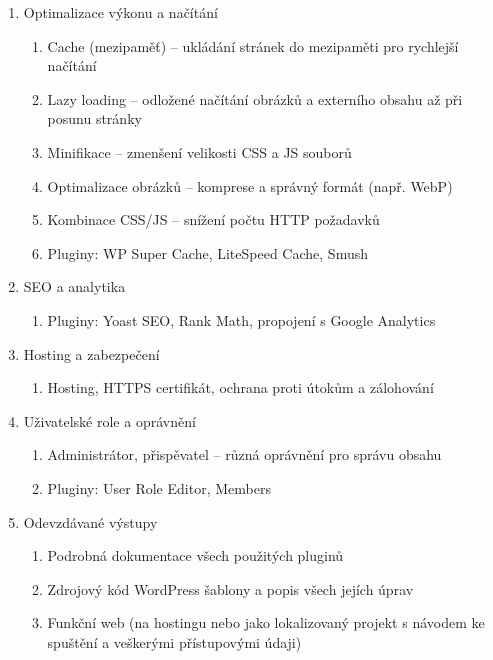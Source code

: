 \begin{enumerate}
  \begin{enumerate}
  \def\labelenumii{\alph{enumii}.}
  \tightlist
  \item
    Vytvoření galerie s možností seskupení podle názvu nebo roku
  \item
    Pluginy: Modula, Envira Gallery, NextGEN Gallery
  \end{enumerate}
\item
  Optimalizace výkonu a načítání

  \begin{enumerate}
  \def\labelenumii{\alph{enumii}.}
  \tightlist
  \item
    Cache (mezipaměť) -- ukládání stránek do mezipaměti pro rychlejší
    načítání
  \item
    Lazy loading -- odložené načítání obrázků a externího obsahu až při
    posunu stránky
  \item
    Minifikace -- zmenšení velikosti CSS a JS souborů
  \item
    Optimalizace obrázků -- komprese a správný formát (např. WebP)
  \item
    Kombinace CSS/JS -- snížení počtu HTTP požadavků
  \item
    Pluginy: WP Super Cache, LiteSpeed Cache, Smush
  \end{enumerate}
\item
  SEO a analytika

  \begin{enumerate}
  \def\labelenumii{\alph{enumii}.}
  \tightlist
  \item
    Pluginy: Yoast SEO, Rank Math, propojení s Google Analytics
  \end{enumerate}
\item
  Hosting a zabezpečení

  \begin{enumerate}
  \def\labelenumii{\alph{enumii}.}
  \tightlist
  \item
    Hosting, HTTPS certifikát, ochrana proti útokům a zálohování
  \end{enumerate}
\item
  Uživatelské role a oprávnění

  \begin{enumerate}
  \def\labelenumii{\alph{enumii}.}
  \tightlist
  \item
    Administrátor, přispěvatel -- různá oprávnění pro správu obsahu
  \item
    Pluginy: User Role Editor, Members
  \end{enumerate}
\item
  Odevzdávané výstupy

  \begin{enumerate}
  \def\labelenumii{\alph{enumii}.}
  \tightlist
  \item
    Podrobná dokumentace všech použitých pluginů
  \item
    Zdrojový kód WordPress šablony a popis všech jejích úprav
  \item
    Funkční web (na hostingu nebo jako lokalizovaný projekt s návodem ke
    spuštění a veškerými přístupovými údaji)
  \end{enumerate}
\end{enumerate}

